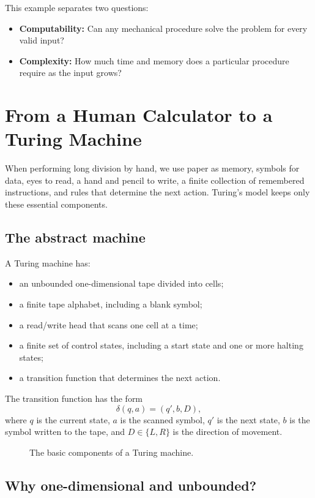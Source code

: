 \documentclass[11pt]{article}
\begin{document}
This example separates two questions:
\begin{itemize}
  \item \textbf{Computability:} Can any mechanical procedure solve the problem for every valid input?
  \item \textbf{Complexity:} How much time and memory does a particular procedure require as the input grows?
\end{itemize}

\section{From a Human Calculator to a Turing Machine}

When performing long division by hand, we use paper as memory, symbols for data, eyes to read, a hand and pencil to write, a finite collection of remembered instructions, and rules that determine the next action. Turing's model keeps only these essential components.

\subsection{The abstract machine}

A Turing machine has:
\begin{itemize}
  \item an unbounded one-dimensional tape divided into cells;
  \item a finite tape alphabet, including a blank symbol;
  \item a read/write head that scans one cell at a time;
  \item a finite set of control states, including a start state and one or more halting states;
  \item a transition function that determines the next action.
\end{itemize}

The transition function has the form
\[
  \delta(q,a)=(q',b,D),
\]
where $q$ is the current state, $a$ is the scanned symbol, $q'$ is the next state, $b$ is the symbol written to the tape, and $D\in\{L,R\}$ is the direction of movement.

\begin{figure}[htbp]
  \centering
  
  \caption{The basic components of a Turing machine.}
  \label{fig:turing-machine-components}
\end{figure}

\subsection{Why one-dimensional and unbounded?}
\end{document}
